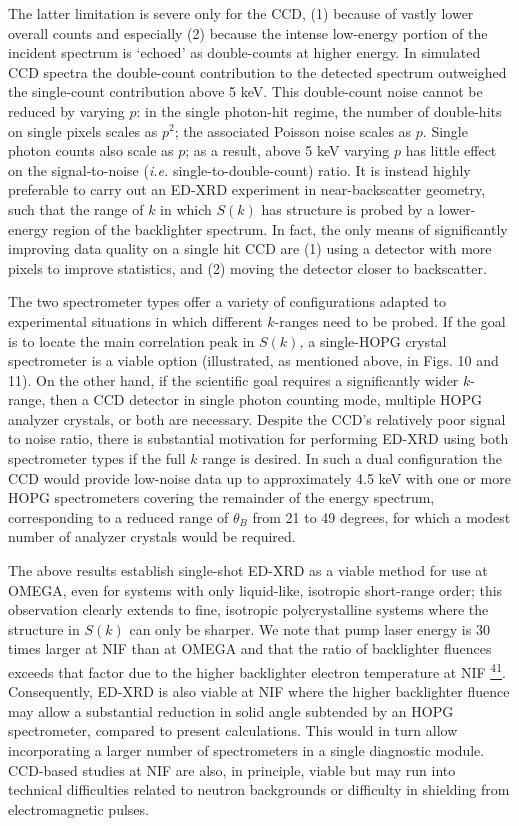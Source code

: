 The latter limitation is severe only for the CCD, (1) because of vastly
lower overall counts and especially (2) because the intense low-energy
portion of the incident spectrum is `echoed' as double-counts at higher
energy. In simulated CCD spectra the double-count contribution to the
detected spectrum outweighed the single-count contribution above 5 keV.
This double-count noise cannot be reduced by varying \(p\): in the
single photon-hit regime, the number of double-hits on single pixels
scales as \(p^{2}\); the associated Poisson noise scales as \(p\).
Single photon counts also scale as \(p\); as a result, above 5 keV
varying \(p\) has little effect on the signal-to-noise (\emph{i.e.}
single-to-double-count) ratio. It is instead highly preferable to carry
out an ED-XRD experiment in near-backscatter geometry, such that the
range of \(k\) in which \(S(k)\) has structure is probed by a
lower-energy region of the backlighter spectrum. In fact, the only means
of significantly improving data quality on a single hit CCD are (1)
using a detector with more pixels to improve statistics, and (2) moving
the detector closer to backscatter.

The two spectrometer types offer a variety of configurations adapted to
experimental situations in which different \(k\)-ranges need to be
probed. If the goal is to locate the main correlation peak in
\(S(k)\)\emph{,} a single-HOPG crystal spectrometer is a viable option
(illustrated, as mentioned above, in Figs. 10 and 11). On the other
hand, if the scientific goal requires a significantly wider \(k\)-range,
then a CCD detector in single photon counting mode, multiple HOPG
analyzer crystals, or both are necessary. Despite the CCD's relatively
poor signal to noise ratio, there is substantial motivation for
performing ED-XRD using both spectrometer types if the full \(k\) range
is desired. In such a dual configuration the CCD would provide low-noise
data up to approximately 4.5 keV with one or more HOPG spectrometers
covering the remainder of the energy spectrum, corresponding to a
reduced range of \(\theta_{B}\) from 21 to 49 degrees, for which a
modest number of analyzer crystals would be required.

The above results establish single-shot ED-XRD as a viable method for
use at OMEGA, even for systems with only liquid-like, isotropic
short-range order; this observation clearly extends to fine, isotropic
polycrystalline systems where the structure in \(S(k)\) can only be
sharper. We note that pump laser energy is 30 times larger at NIF than
at OMEGA and that the ratio of backlighter fluences exceeds that factor
due to the higher backlighter electron temperature at NIF
\hyperref[b.-r.-maddox-et-al.-physics-of-plasmas-18-056709-2011.]{\textsuperscript{41}}.
Consequently, ED-XRD is also viable at NIF where the higher backlighter
fluence may allow a substantial reduction in solid angle subtended by an
HOPG spectrometer, compared to present calculations. This would in turn
allow incorporating a larger number of spectrometers in a single
diagnostic module. CCD-based studies at NIF are also, in principle,
viable but may run into technical difficulties related to neutron
backgrounds or difficulty in shielding from electromagnetic pulses.

